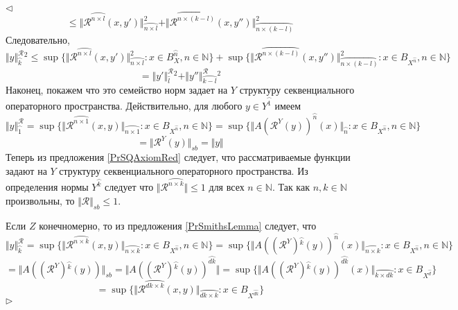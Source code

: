 \documentclass[12pt]{article}
\newenvironment{proof}{\par $\triangleleft$}{$\triangleright$}
\begin{document}
\begin{proof}
$$\leq\Vert\mathcal{R}^{\wideparen{n\times l}}(x,y')\Vert_{\wideparen{n\times l}}^2
+\Vert\mathcal{R}^{\wideparen{n\times (k-l)}}(x,y'')\Vert_{\wideparen{n\times (k-l)}}^2
$$
Следовательно,
$$
\Vert y\Vert_{\wideparen{k}}^{\mathcal{R}}{}^2
\leq\sup\{\Vert\mathcal{R}^{\wideparen{n\times l}}(x,y')\Vert_{\wideparen{n\times l}}^2:x\in B_X^{\wideparen{n}},n\in\mathbb{N}\}
+\sup\{\Vert\mathcal{R}^{\wideparen{n\times (k-l)}}(x,y'')\Vert_{\wideparen{n\times (k-l)}}^2:x\in B_{X^{\wideparen{n}}},n\in\mathbb{N}\}
$$
$$
=\Vert y'\Vert_{\wideparen{l}}^{\mathcal{R}}{}^2
+\Vert y''\Vert_{\wideparen{k-l}}^{\mathcal{R}}{}^2
$$
Наконец, покажем что это семейство норм задает на $Y$ структуру секвенциального операторного пространства. Действительно, для любого $y\in Y^{\wideparen{1}}$ имеем
$$
\Vert y\Vert_{\wideparen{1}}^{\mathcal{R}}
=\sup\{\Vert\mathcal{R}^{\wideparen{n\times 1}}(x,y)\Vert_{\wideparen{n\times 1}}:x\in B_{X^{\wideparen{n}}},n\in\mathbb{N}\}
=\sup\{\Vert A(\mathcal{R}^Y(y))^{\wideparen{n}}(x)\Vert_{\wideparen{n}}:x\in B_{X^{\wideparen{n}}},n\in\mathbb{N}\}
$$
$$
=\Vert \mathcal{R}^Y(y)\Vert_{sb}=\Vert y\Vert
$$
Теперь из предложения \ref{PrSQAxiomRed} следует, что рассматриваемые функции задают на $Y$ структуру секвенциального операторного пространства. Из определения нормы $Y^{\wideparen{k}}$ следует что $\Vert\mathcal{R}^{\wideparen{n\times k}}\Vert\leq 1$ для 
всех $n\in\mathbb{N}$. Так как $n,k\in\mathbb{N}$ произвольны, то $\Vert\mathcal{R}\Vert_{sb}\leq 1$.

Если $Z$ конечномерно, то из предложения \ref{PrSmithsLemma} следует, что
$$
\Vert y\Vert_{\wideparen{k}}^{\mathcal{R}}
=\sup\{\Vert\mathcal{R}^{\wideparen{n\times k}}(x,y)\Vert_{\wideparen{n\times k}}:x\in B_{X^{\wideparen{n}}},n\in\mathbb{N}\}
=\sup\{\Vert A((\mathcal{R}^Y){}^{\wideparen{k}}(y))^{\wideparen{n}}(x)\Vert_{\wideparen{n\times k}}:x\in B_{X^{\wideparen{n}}},n\in\mathbb{N}\}
$$
$$
=\Vert A((\mathcal{R}^Y){}^{\wideparen{k}}(y))\Vert_{sb}
=\Vert A((\mathcal{R}^Y){}^{\wideparen{k}}(y))^{\wideparen{dk}}\Vert
=\sup\{\Vert A((\mathcal{R}^Y){}^{\wideparen{k}}(y))^{\wideparen{dk}}(x)\Vert_{\wideparen{k\times dk}}:x\in B_{X^{\wideparen{d}}}\}
$$
$$
=\sup\{\Vert\mathcal{R}^{\wideparen{dk\times k}}(x,y)\Vert_{\wideparen{dk\times k}}:x\in B_{X^{\wideparen{dk}}}\}
$$
\end{proof}
\end{document}
